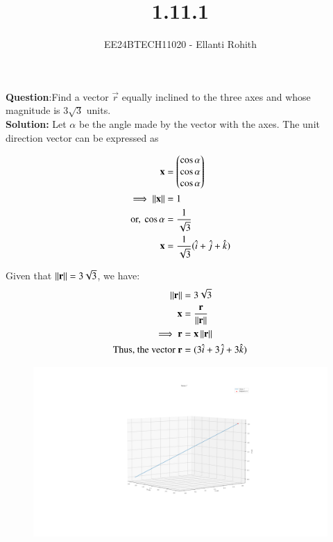 \documentclass[journal]{IEEEtran}
\begin{document}

\vspace{3cm}

\title{1.11.1}
\author{EE24BTECH11020 - Ellanti Rohith}
{\let\newpage\relax\maketitle}

\renewcommand{\thefigure}{\theenumi}
\renewcommand{\thetable}{\theenumi}
\setlength{\intextsep}{10pt} %


\renewcommand{\thetable}{\theenumi}


\textbf{Question}:Find a vector $\overrightarrow{r}$ equally inclined to the three axes and whose magnitude is $3\sqrt{3}$ units.\\ \textbf{Solution:} Let $\alpha$ be the angle made by the vector with the axes.  The unit direction vector can be expressed as
   
\begin{align}
\mathbf{x} &= \begin{pmatrix}\cos\alpha \\ \cos\alpha \\ \cos\alpha\end{pmatrix} \\
\implies \left\lVert\mathbf{x}\right\rVert &= 1 \\
\text{or, } \cos\alpha &= \frac{1}{\sqrt{3}} \\
\mathbf{x} &= \frac{1}{\sqrt{3}} (\hat{i} + \hat{j} + \hat{k})
\end{align}

Given that \(\left\lVert\mathbf{r}\right\rVert = 3\sqrt{3}\), we have:
\begin{align}
\left\lVert\mathbf{r}\right\rVert &= 3\sqrt{3} \\
\mathbf{x} &= \frac{\mathbf{r}}{\left\lVert\mathbf{r}\right\rVert} \\
\implies \mathbf{r} &= \mathbf{x} \left\lVert\mathbf{r}\right\rVert \\
\text{Thus, the vector } \mathbf{r} &= (3\hat{i} + 3\hat{j} + 3\hat{k})
\end{align}


\newpage

\begin{figure}[h!]
   \centering \includegraphics[width=1.1\textwidth]{figs/fig.png}
   \label{Plot of Given Vector}
   \end{figure}
	
\end{document}
